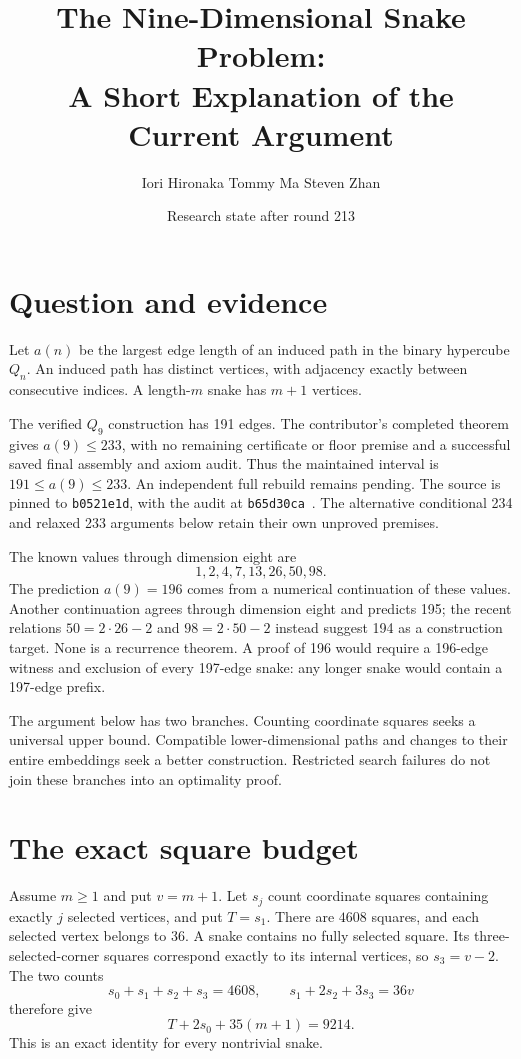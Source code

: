 \documentclass[11pt,a4paper]{article}
\title{The Nine-Dimensional Snake Problem:\\A Short Explanation of the Current Argument}
\author{Iori Hironaka \quad Tommy Ma \quad Steven Zhan}
\date{Research state after round 213}
\begin{document}
\maketitle

\section{Question and evidence}
Let $a(n)$ be the largest edge length of an induced path in the binary
hypercube $Q_n$. An induced path has distinct vertices, with adjacency
exactly between consecutive indices. A length-$m$ snake has $m+1$ vertices.

The verified $Q_9$ construction has 191 edges. The contributor's completed
theorem gives $a(9)\le233$, with no remaining certificate or floor premise
and a successful saved final assembly and axiom audit. Thus the maintained
interval is $191\le a(9)\le233$. An independent full rebuild remains
pending. The source is pinned to \texttt{b0521e1d}, with the audit at
\texttt{b65d30ca}~\cite{bound233archive}. The alternative conditional 234
and relaxed 233 arguments below retain their own unproved premises.

The known values through dimension eight are
\[
1,2,4,7,13,26,50,98.
\]
The prediction $a(9)=196$ comes from a numerical continuation of these
values. Another continuation agrees through dimension eight and predicts
195; the recent relations $50=2\cdot26-2$ and $98=2\cdot50-2$ instead
suggest 194 as a construction target. None is a recurrence theorem.
A proof of 196 would require a 196-edge witness and exclusion of every
197-edge snake: any longer snake would contain a 197-edge prefix.

The argument below has two branches. Counting coordinate squares seeks
a universal upper bound. Compatible lower-dimensional paths and changes
to their entire embeddings seek a better construction. Restricted
search failures do not join these branches into an optimality proof.

\section{The exact square budget}
Assume $m\ge1$ and put $v=m+1$. Let $s_j$ count coordinate squares
containing exactly $j$ selected vertices, and put $T=s_1$.
There are $4608$ squares, and each selected vertex belongs to 36.
A snake contains no fully selected square. Its three-selected-corner
squares correspond exactly to its internal vertices, so $s_3=v-2$.
The two counts
\[
s_0+s_1+s_2+s_3=4608,\qquad s_1+2s_2+3s_3=36v
\]
therefore give
\[
\boxed{T+2s_0+35(m+1)=9214.}
\]
This is an exact identity for every nontrivial snake.
\end{document}
